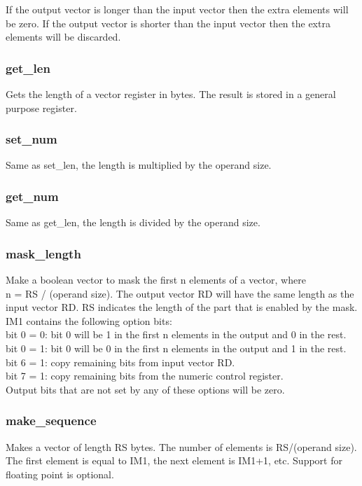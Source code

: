 \documentclass[forwardcom.tex]{subfiles}
\begin{document}
If the output vector is longer than the input vector then the extra elements will be zero. If the output vector is shorter than the input vector then the extra elements will be discarded. 

\subsubsection{get\_len}
Gets the length of a vector register in bytes. The result is stored in a general purpose register.

\subsubsection{set\_num}
Same as set\_len, the length is multiplied by the operand size.

\subsubsection{get\_num}
Same as get\_len, the length is divided by the operand size.

\subsubsection{mask\_length}
Make a boolean vector to mask the first n elements of a vector, where \\
n = RS / (operand size). The output vector RD will have the same length as the input vector RD. RS indicates the length of the part that is enabled by the mask. IM1 contains the following option bits: \\
bit 0 = 0: bit 0 will be 1 in the first n elements in the output and 0 in the rest. \\
bit 0 = 1: bit 0 will be 0 in the first n elements in the output and 1 in the rest. \\
bit 6 = 1: copy remaining bits from input vector RD. \\
bit 7 = 1: copy remaining bits from the numeric control register. \\
Output bits that are not set by any of these options will be zero.

\subsubsection{make\_sequence}
Makes a vector of length RS bytes. The number of elements is RS/(operand size).
The first element is equal to IM1, the next element is IM1+1, etc.
Support for floating point is optional.
\vspace{2mm}
\end{document}
